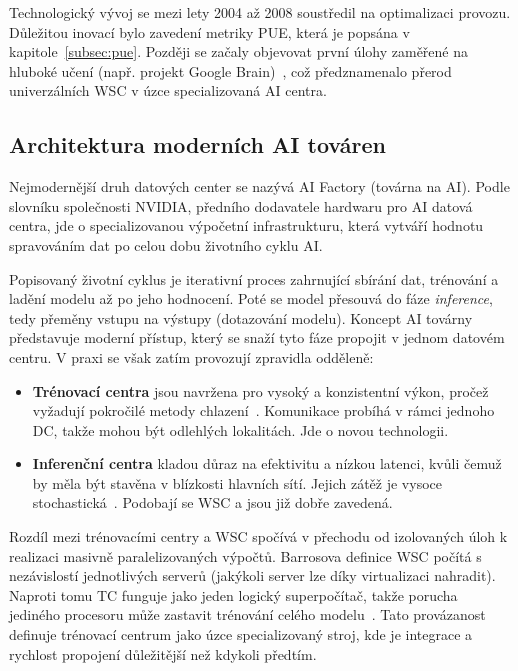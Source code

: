 Technologický vývoj se mezi lety 2004 až 2008 soustředil na optimalizaci provozu. Důležitou inovací bylo zavedení metriky PUE, která je popsána v kapitole~\ref{subsec:pue}. Později se začaly objevovat první úlohy zaměřené na hluboké učení (např. projekt Google Brain)~\cite{ranganathan_twenty_2024}, což předznamenalo přerod univerzálních WSC v úzce specializovaná AI centra.

\subsection{Architektura moderních AI továren}
\label{subsec:ai_factory}

Nejmodernější druh datových center se nazývá AI Factory (továrna na AI). Podle slovníku společnosti NVIDIA, předního dodavatele hardwaru pro AI datová centra, jde o specializovanou výpočetní infrastrukturu, která vytváří hodnotu spravováním dat po celou dobu životního cyklu AI.~\cite{nvidia_what_2026}

Popisovaný životní cyklus je iterativní proces zahrnující sbírání dat, trénování a ladění modelu až po jeho hodnocení. Poté se model přesouvá do fáze \textit{inference}, tedy přeměny vstupu na výstupy (dotazování modelu). Koncept AI továrny představuje moderní přístup, který se snaží tyto fáze propojit v jednom datovém centru. V praxi se však zatím provozují zpravidla odděleně:

\begin{itemize}
    \item \textbf{Trénovací centra} jsou navržena pro vysoký a konzistentní výkon, pročež vyžadují pokročilé metody chlazení~\cite{cruzes_data_2025}. Komunikace probíhá v rámci jednoho DC, takže mohou být odlehlých lokalitách. Jde o novou technologii.

    \item \textbf{Inferenční centra} kladou důraz na efektivitu a nízkou latenci, kvůli čemuž by měla být stavěna v blízkosti hlavních sítí. Jejich zátěž je vysoce stochastická~\cite{cruzes_data_2025, ginzburg-ganz_technical_2025}. Podobají se WSC a jsou již dobře zavedená.
\end{itemize}

Rozdíl mezi trénovacími centry a WSC spočívá v přechodu od izolovaných úloh k realizaci masivně paralelizovaných výpočtů. Barrosova definice WSC počítá s nezávislostí jednotlivých serverů (jakýkoli server lze díky virtualizaci nahradit). Naproti tomu TC funguje jako jeden logický superpočítač, takže porucha jediného procesoru může zastavit trénování celého modelu~\cite[s.~270]{barroso_data_2026}. Tato provázanost definuje trénovací centrum jako úzce specializovaný stroj, kde je integrace a rychlost propojení důležitější než kdykoli předtím.

